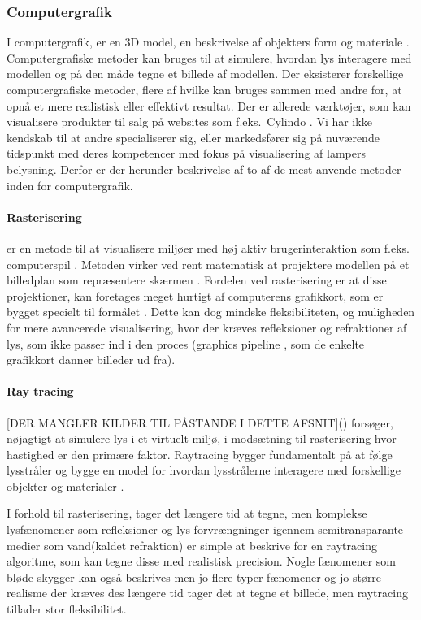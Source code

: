 \subsubsection{Computergrafik}
\label{sec:computergrafik}
I computergrafik, er en 3D model, en beskrivelse af objekters form og materiale \cite{computergrafik_introduktion}. Computergrafiske metoder kan bruges til at simulere, hvordan lys interagere med modellen og på den måde tegne et billede af modellen. Der eksisterer forskellige computergrafiske metoder, flere af hvilke kan bruges sammen med andre for, at opnå et mere realistisk eller effektivt resultat. Der er allerede værktøjer, som kan visualisere produkter til salg på websites som f.eks.\ Cylindo \cite{Cylindo}. Vi har ikke kendskab til at andre specialiserer sig, eller markedsfører sig på nuværende tidspunkt med deres kompetencer med fokus på visualisering af lampers belysning. Derfor er der herunder beskrivelse af to af de mest anvende metoder inden for computergrafik.

\paragraph{Rasterisering}
er en metode til at visualisere miljøer med høj aktiv brugerinteraktion som f.eks. computerspil \cite{rastarization}. Metoden virker ved rent matematisk at projektere modellen på et billedplan som repræsentere skærmen \cite{rastarization}. Fordelen ved rasterisering er at disse projektioner, kan foretages meget hurtigt af computerens grafikkort, som er bygget specielt til formålet \cite{rastarization}. Dette kan dog mindske fleksibiliteten, og muligheden for mere avancerede visualisering, hvor der kræves refleksioner og refraktioner af lys, som ikke passer ind i den proces (graphics pipeline \cite{rastarization}, som de enkelte grafikkort danner billeder ud fra). 

\paragraph{Ray tracing} [DER MANGLER KILDER TIL PÅSTANDE I DETTE AFSNIT]() forsøger, nøjagtigt at simulere lys i et virtuelt miljø, i modsætning til rasterisering hvor hastighed er den primære faktor. Raytracing bygger fundamentalt på at følge lysstråler og bygge en model for hvordan lysstrålerne interagere med forskellige objekter og materialer \cite{raytracing_for_begyndere}. 

I forhold til rasterisering, tager det længere tid at tegne, men komplekse lysfænomener som refleksioner og lys forvrængninger igennem semitransparante medier som vand(kaldet refraktion) er simple at beskrive for en raytracing algoritme, som kan tegne disse med realistisk precision. Nogle fænomener som bløde skygger kan også beskrives men jo flere typer fænomener og jo større realisme der kræves des længere tid tager det at tegne et billede, men raytracing tillader stor fleksibilitet.
